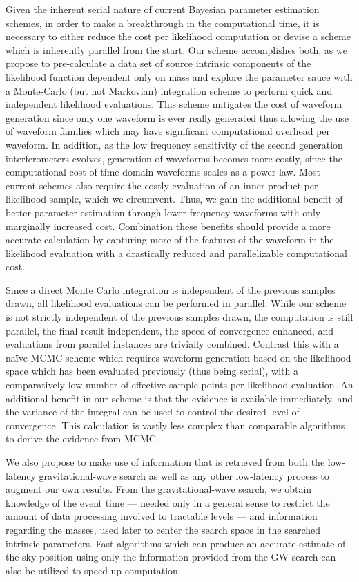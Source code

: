 Given the inherent serial nature of current Bayesian parameter estimation schemes, in order to make a breakthrough in the computational time, it is necessary to either reduce the cost per likelihood computation or devise a scheme which is inherently parallel from the start. Our scheme accomplishes both, as we propose to pre-calculate a data set of source intrinsic components of the likelihood function dependent only on mass and explore the parameter sauce with a Monte-Carlo (but not Markovian) integration scheme to perform quick and independent likelihood evaluations. This scheme mitigates the cost of waveform generation since only one waveform is ever really generated thus allowing the use of waveform families which may have significant computational overhead per waveform. In addition, as the low frequency sensitivity of the second generation interferometers evolves, generation of waveforms becomes more costly, since the computational cost of time-domain waveforms scales as a power law. Most current schemes also require the costly evaluation of an inner product per likelihood sample, which we circumvent. Thus, we gain the additional benefit of better parameter estimation through lower frequency waveforms with only marginally increased cost. Combination these benefits should provide a more accurate calculation by capturing more of the features of the waveform in the likelihood evaluation with a drastically reduced and parallelizable computational cost.

Since a direct Monte Carlo integration is independent of the previous samples drawn, all likelihood evaluations can be performed in parallel. While our scheme is not strictly independent of the previous samples drawn, the computation is still parallel, the final result independent, the speed of convergence enhanced, and evaluations from parallel instances are trivially combined. Contrast this with a na\"ive MCMC scheme which requires waveform generation based on the likelihood space which has been evaluated previously (thus being serial), with a comparatively low number of effective sample points per likelihood evaluation. An additional benefit in our scheme is that the evidence is available immediately, and the variance of the integral can be used to control the desired level of convergence. This calculation is vastly less complex than comparable algorithms to derive the evidence from MCMC\cite{thermoint}.

We also propose to make use of information that is retrieved from both the low-latency gravitational-wave search as well as any other low-latency process to augment our own results. From the gravitational-wave search, we obtain knowledge of the event time --- needed only in a general sense to restrict the amount of data processing involved to tractable levels --- and information regarding the masses, used later to center the search space in the searched intrinsic parameters. Fast algorithms which can produce an accurate estimate of the sky position using only the information provided from the GW search\cite{bayestar} can also be utilized to speed up computation.

